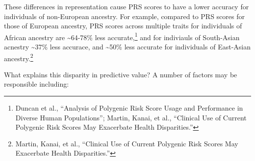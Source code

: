 \documentclass[
  9pt,
]{book}
\begin{document}
These differences in representation cause PRS scores to have a lower accuracy for individuals of non-European ancestry. For example, compared to PRS scores for those of European ancestry, PRS scores across multiple traits for individuals of African ancestry are \textasciitilde64-78\% less accurate,\footnote{Duncan et al., {``Analysis of Polygenic Risk Score Usage and Performance in Diverse Human Populations''}; Martin, Kanai, et al., {``Clinical Use of Current Polygenic Risk Scores May Exacerbate Health Disparities.''}} and for indiviauls of South-Asian acnestry \textasciitilde37\% less accurace, and \textasciitilde50\% less accurate for individuals of East-Asian ancestry.\footnote{Martin, Kanai, et al., {``Clinical Use of Current Polygenic Risk Scores May Exacerbate Health Disparities.''}}

What explains this disparity in predictive value? A number of factors may be responsible including:
\end{document}
